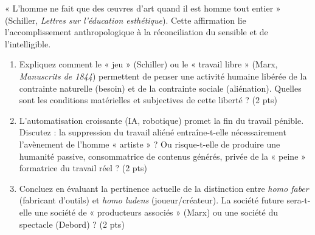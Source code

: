 \documentclass[11pt]{article}
\begin{document}
\begin{exercice}
« L'homme ne fait que des œuvres d'art quand il est homme tout entier » (Schiller, \textit{Lettres sur l'éducation esthétique}). Cette affirmation lie l'accomplissement anthropologique à la réconciliation du sensible et de l'intelligible.

\begin{enumerate}
    \item Expliquez comment le « jeu » (Schiller) ou le « travail libre » (Marx, \textit{Manuscrits de 1844}) permettent de penser une activité humaine libérée de la contrainte naturelle (besoin) et de la contrainte sociale (aliénation). Quelles sont les conditions matérielles et subjectives de cette liberté ? (2 pts)
    \item L'automatisation croissante (IA, robotique) promet la fin du travail pénible. Discutez : la suppression du travail aliéné entraîne-t-elle nécessairement l'avènement de l'homme « artiste » ? Ou risque-t-elle de produire une humanité passive, consommatrice de contenus générés, privée de la « peine » formatrice du travail réel ? (2 pts)
    \item Concluez en évaluant la pertinence actuelle de la distinction entre \textit{homo faber} (fabricant d'outils) et \textit{homo ludens} (joueur/créateur). La société future sera-t-elle une société de « producteurs associés » (Marx) ou une société du spectacle (Debord) ? (2 pts)
\end{enumerate}
\end{exercice}
\end{document}
